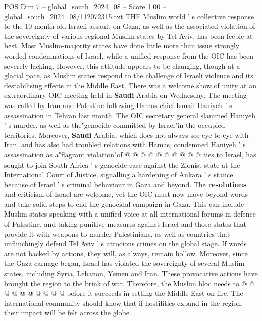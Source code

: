 \begin{textsample}{POS Dim 7 – global\_south\_2024\_08 – Score 1.00 – global\_south\_2024\_08/112072315.txt}  \label{ex:f7_pos_078}
THE Muslim world ' s collective response to the 10-month-old Israeli assault on Gaza, as well as the associated violation of the sovereignty of various regional Muslim states by Tel Aviv, has been feeble at best.
Most Muslim-majority states have done little more than issue strongly worded condemnations of Israel, while a unified response from the OIC has been severely lacking.
However, this attitude appears to be changing, though at a glacial pace, as Muslim states respond to the challenge of Israeli violence and its destabilising effects in the Middle East.
There was a welcome show of unity at an extraordinary OIC meeting held in \textbf{Saudi} Arabia on Wednesday.
The meeting was called by Iran and Palestine following Hamas chief Ismail Haniyeh ' s assassination in Tehran last month.
The OIC secretary general slammed Haniyeh ' s murder, as well as the"genocide committed by Israel"in the occupied territories.
Moreover, \textbf{Saudi} Arabia, which does not always see eye to eye with Iran, and has also had troubled relations with Hamas, condemned Haniyeh ' s assassination as a"flagrant violation"of @ @ @ @ @ @ @ @ @ @ ties to Israel, has sought to join South Africa ' s genocide case against the Zionist state at the International Court of Justice, signalling a hardening of Ankara ' s stance because of Israel ' s criminal behaviour in Gaza and beyond.
The \textbf{resolutions} and criticism of Israel are welcome, yet the OIC must now move beyond words and take solid steps to end the genocidal campaign in Gaza.
This can include Muslim states speaking with a unified voice at all international forums in defence of Palestine, and taking punitive measures against Israel and those states that provide it with weapons to murder Palestinians, as well as countries that unflinchingly defend Tel Aviv ' s atrocious crimes on the global stage.
If words are not backed by actions, they will, as always, remain hollow.
Moreover, since the Gaza carnage began, Israel has violated the sovereignty of several Muslim states, including Syria, Lebanon, Yemen and Iran.
These provocative actions have brought the region to the brink of war.
Therefore, the Muslim bloc needs to @ @ @ @ @ @ @ @ @ @ before it succeeds in setting the Middle East on fire.
The international community should know that if hostilities expand in the region, their impact will be felt across the globe.

\end{textsample}
